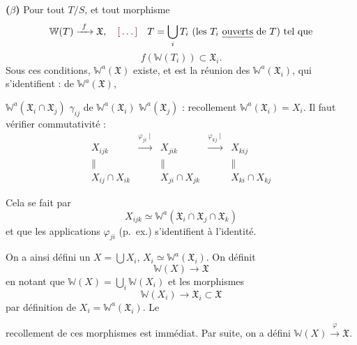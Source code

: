 \documentclass[11pt,a4paper]{article}
\begin{document}
\textbf{($\beta$)} Pour tout $T/S$, et tout
morphisme
\[
  \mathbb{W}(T) \xrightarrow{\ f\ } \mathfrak{X}, \quad \ill{} \quad
  T = \bigcup_{i} T_i \ \text{(les $T_i$ \uncertain{ouverts} de $T$) tel que}
\]
\[
  f(\mathbb{W}(T_i)) \subset \mathfrak{X}_i .
\]
Sous ces conditions, $\mathbb{W}^{a}(\mathfrak{X})$
existe, et est la réunion des $\mathbb{W}^{a}(\mathfrak{X}_i)$,
qui s'identifient :   de
$\mathbb{W}^{a}(\mathfrak{X})$,

$\mathbb{W}^{a}(\mathfrak{X}_i \cap \mathfrak{X}_j)$ \ill{}
$\gamma_{ij}$  \ill{} 
\add{\ill{}}  \ill{} de
$\mathbb{W}^{a}(\mathfrak{X}_i)$ \ill{} 
$\mathbb{W}^{a}(\mathfrak{X}_j)$ : \ill{} \ill{} \ill{}
recollement  $\mathbb{W}^{a}(\mathfrak{X}_i) = X_i$. Il
faut vérifier \ill{} \ill{}  \ill{}
commutativité :
\[
  \begin{array}{ccccc}
  X_{ijk} & \xrightarrow{\varphi_{ji} \mid} & X_{jik} & \xrightarrow{\varphi_{kj} \mid} & X_{kij} \\
  \| & & \| & & \| \\
  X_{ij} \cap X_{ik} & & X_{ji} \cap X_{jk} & & X_{ki} \cap X_{kj}
  \end{array}
\]

Cela \ill{} \ill{} se fait par \ill{} \ill{}
\[
  X_{ijk} \simeq \mathbb{W}^{a}(\mathfrak{X}_i \cap \mathfrak{X}_j \cap
  \mathfrak{X}_k)
\]
et que les applications $\varphi_{ji}$ (p.\ ex.)
s'identifient à l'identité.

On a ainsi défini un $X = \bigcup X_i$, $X_i \simeq
\mathbb{W}^{a}(\mathfrak{X}_i)$. On définit
\[
  \mathbb{W}(X) \to \mathfrak{X}
\]
en notant que $\mathbb{W}(X) = \bigcup_i \mathbb{W}(X_i)$
\struck{$\simeq$} et  les \struck{\ill{}} morphismes
\[
  \mathbb{W}(X_i) \to \mathfrak{X}_i \subset \mathfrak{X}
\]
par définition de $X_i = \mathbb{W}^{a}(\mathfrak{X}_i)$. Le

recollement de ces morphismes est immédiat.
Par suite, on a défini $\mathbb{W}(X) \xrightarrow{\ \varphi\ }
\mathfrak{X}$.
\end{document}
